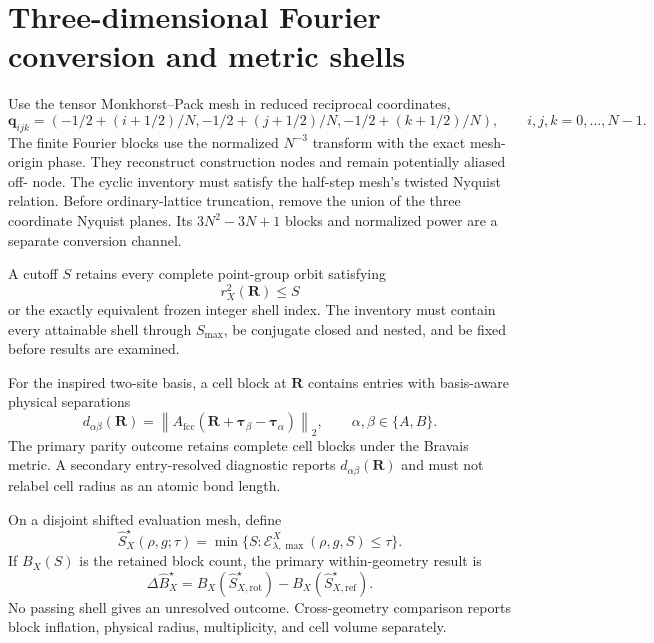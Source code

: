\documentclass[11pt]{article}
\newcommand{\norm}[1]{\left\lVert #1\right\rVert}
\begin{document}
\section{Three-dimensional Fourier conversion and metric shells}

Use the tensor Monkhorst--Pack mesh in reduced reciprocal coordinates,
\begin{equation}
 \mathbf q_{ijk}=(-1/2+(i+1/2)/N,-1/2+(j+1/2)/N,
                  -1/2+(k+1/2)/N),
 \qquad i,j,k=0,\ldots,N-1.
\end{equation}
The finite Fourier blocks use the normalized $N^{-3}$ transform with the exact mesh-
origin phase.  They reconstruct construction nodes and remain potentially aliased off-
node.  The cyclic inventory must satisfy the half-step mesh's twisted Nyquist relation.
Before ordinary-lattice truncation, remove the union of the three coordinate Nyquist planes.  Its
$3N^2-3N+1$ blocks and normalized power are a separate conversion channel.

A cutoff $S$ retains every complete point-group orbit satisfying
\begin{equation}
 r_X^2(\mathbf R)\le S
\end{equation}
or the exactly equivalent frozen integer shell index.  The inventory must contain every
attainable shell through $S_{\max}$, be conjugate closed and nested, and be fixed before
results are examined.

For the inspired two-site basis, a cell block at $\mathbf R$ contains entries with
basis-aware physical separations
\begin{equation}
 d_{\alpha\beta}(\mathbf R)
 =\norm{A_{\mathrm{fcc}}(\mathbf R+\boldsymbol\tau_\beta-
 \boldsymbol\tau_\alpha)}_2,
 \qquad \alpha,\beta\in\{A,B\}.
 \label{eq:basis-aware-distance}
\end{equation}
The primary parity outcome retains complete cell blocks under the Bravais metric.  A
secondary entry-resolved diagnostic reports $d_{\alpha\beta}(\mathbf R)$ and must not
relabel cell radius as an atomic bond length.

On a disjoint shifted evaluation mesh, define
\begin{equation}
 \widehat S_X^\star(\rho,g;\tau)
 =\min\{S:\mathcal E_{\lambda,\max}^{X}(\rho,g,S)\le\tau\}.
\end{equation}
If $B_X(S)$ is the retained block count, the primary within-geometry result is
\begin{equation}
 \Delta\widehat B_X^\star
 =B_X(\widehat S_{X,\mathrm{rot}}^\star)
  -B_X(\widehat S_{X,\mathrm{ref}}^\star).
 \label{eq:block-inflation}
\end{equation}
No passing shell gives an unresolved outcome.  Cross-geometry comparison reports block
inflation, physical radius, multiplicity, and cell volume separately.
\end{document}
